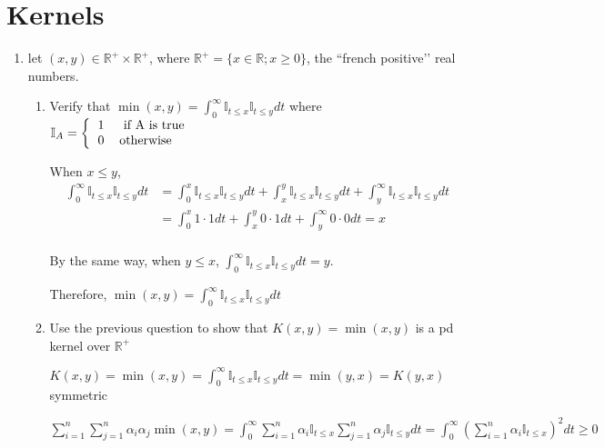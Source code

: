 \documentclass[11pt]{article}
\begin{document}



\section{Kernels}

\begin{enumerate}
\item let $(x,y) \in \mathbb{R}^+ \times \mathbb{R}^+$, where $\mathbb{R}^+=\{x \in \mathbb{R};x \geq 0\}$, the ``french positive\rq\rq{} real numbers. 

\begin{enumerate}
\item  Verify that $\min(x,y) = \int_0^\infty \mathbb{I}_{t\leq x} \mathbb{I}_{t\leq y} dt$
where  $\mathbb{I}_A =  \left\{
\begin{tabular}{ll}
1 & \mbox{ if A is true}\\
0 & \mbox{otherwise}
\end{tabular}\right.$

When $x\le y$,
\begin{align*}
\int_0^\infty \mathbb{I}_{t\leq x} \mathbb{I}_{t\leq y} dt&=\int_0^x \mathbb{I}_{t\leq x} \mathbb{I}_{t\leq y} dt+\int_x^y \mathbb{I}_{t\leq x} \mathbb{I}_{t\leq y} dt+\int_y^\infty \mathbb{I}_{t\leq x} \mathbb{I}_{t\leq y} dt\\
&=\int_0^x 1\cdot 1 dt+\int_x^y 0\cdot 1 dt+\int_y^\infty 0\cdot 0 dt=x\\
\end{align*}

By the same way, when $y\le x$, $\int_0^\infty \mathbb{I}_{t\leq x} \mathbb{I}_{t\leq y} dt=y$.

Therefore, $\min(x,y) = \int_0^\infty \mathbb{I}_{t\leq x} \mathbb{I}_{t\leq y} dt$
\vspace{2mm}
\item Use the previous question to show that $K(x,y)=\min(x,y)$ is a pd kernel over $\mathbb{R}^+$


\vspace{2mm}
$K(x,y)=\min(x,y)=\int_0^\infty \mathbb{I}_{t\leq x} \mathbb{I}_{t\leq y} dt=\min(y,x)=K(y,x)$ symmetric

$\sum_{i=1}^n\sum_{j=1}^n\alpha_i\alpha_j\min(x,y)=\int_0^\infty \sum_{i=1}^n\alpha_i\mathbb{I}_{t\leq x} \sum_{j=1}^n\alpha_j\mathbb{I}_{t\leq y} dt=\int_0^\infty (\sum_{i=1}^n\alpha_i\mathbb{I}_{t\leq x})^2dt\ge0$
\vspace{3mm}



\end{enumerate}
\end{enumerate}
\end{document}
